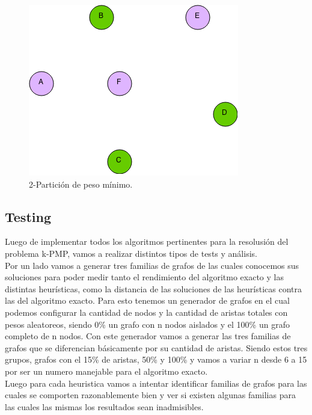 \begin{figure}[H]
\begin{center}
\includegraphics[scale=0.6]{img/kpmp2.png}
\caption{2-Partici\'on de peso m\'inimo.}
\end{center}
\end{figure}


\subsection{Testing}

Luego de implementar todos los algoritmos pertinentes para la resolusión del problema k-PMP, vamos a realizar distintos tipos de tests y análisis.\\

Por un lado vamos a generar tres familias de grafos de las cuales conocemos sus soluciones para poder medir tanto el rendimiento del algoritmo exacto y las distintas heurísticas, como la distancia de las soluciones de las heurísticas contra las del algoritmo exacto. Para esto tenemos un generador de grafos en el cual podemos configurar la cantidad de nodos y la cantidad de aristas totales con pesos aleatoreos, siendo 0\% un grafo con n nodos aislados y el 100\% un grafo completo de n nodos. Con este generador vamos a generar las tres familias de grafos que se diferencian básicamente por su cantidad de aristas. Siendo estos tres grupos, grafos con el 15\% de aristas, 50\% y 100\% y vamos a variar n desde 6 a 15 por ser un numero manejable para el algoritmo exacto.\\

Luego para cada heuristica vamos a intentar identificar familias de grafos para las cuales se comporten razonablemente bien y ver si existen algunas familias para las cuales las mismas los resultados sean inadmisibles.